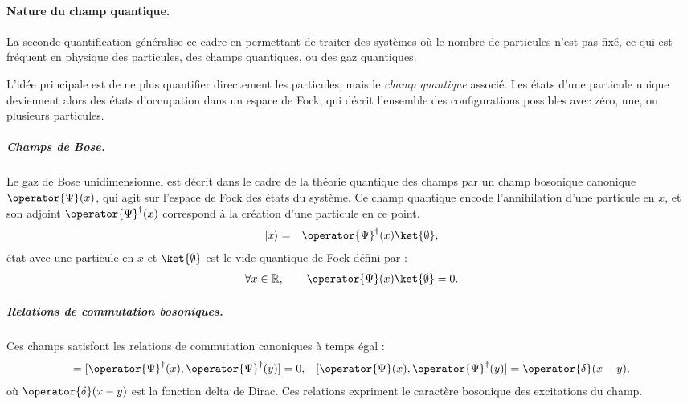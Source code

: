 \paragraph{Nature du champ quantique.}
La seconde quantification généralise ce cadre en permettant de traiter des systèmes où le nombre de particules n’est pas fixé, ce qui est fréquent en physique des particules, des champs quantiques, ou des gaz quantiques.

L’idée principale est de ne plus quantifier directement les particules, mais le \emph{champ quantique} associé. Les états d’une particule unique deviennent alors des états d’occupation dans un espace de Fock, qui décrit l’ensemble des configurations possibles avec zéro, une, ou plusieurs particules.



\subparagraph{Champs de Bose.}
Le gaz de Bose unidimensionnel est décrit dans le cadre de la théorie quantique des champs par un champ bosonique canonique \( \operator{\Psi}(x) \), qui agit sur l’espace de Fock des états du système. Ce champ quantique encode l’annihilation d’une particule en \( x \), et son adjoint \( \operator{\Psi}^\dag(x) \) correspond à la création d’une particule en ce point. 
\begin{eqnarray}
	\vert x \rangle  & = & \operator{\Psi}^\dag (x)\ket{\emptyset} ,
\end{eqnarray}
état avec une particule en  $x$ et \(\ket{\emptyset}\) est le vide quantique de Fock défini par :
\begin{eqnarray}
	\forall x \in \mathbb{R}, \qquad \operator{\Psi}(x) \ket{\emptyset} = 0. \label{chap:eq.vide.fock}
\end{eqnarray}

\subparagraph{Relations de commutation bosoniques.}
Ces champs satisfont les relations de commutation canoniques à temps égal :
\begin{eqnarray}
	 [ \operator{\Psi}(x),  \operator{\Psi}(y)  ]   =  [ \operator{\Psi}^\dag(x),  \operator{\Psi}^\dag(y) ]  =  0,   & & [ \operator{\Psi}(x),  \operator{\Psi}^\dagger(y) ]  =  \operator{\delta}(x - y) ,\label{chap:1:com.1}
\end{eqnarray}
où $\operator{\delta}(x - y)$ est la fonction delta de Dirac.  
Ces relations expriment le caractère bosonique des excitations du champ.

